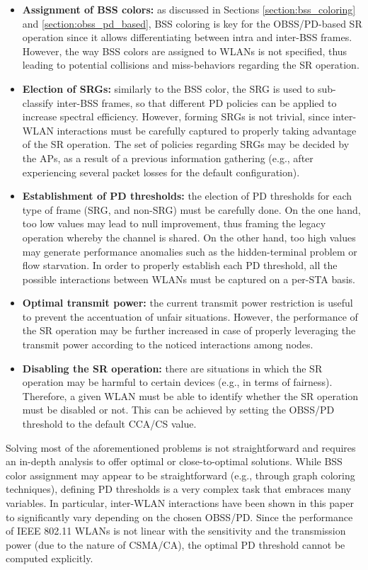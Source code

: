 \documentclass[comsoc]{IEEEtran}
\begin{document}
	\begin{itemize}
		\item \textbf{Assignment of BSS colors:} as discussed in Sections \ref{section:bss_coloring} and \ref{section:obss_pd_based}, BSS coloring is key for the OBSS/PD-based SR operation since it allows differentiating between intra and inter-BSS frames. However, the way BSS colors are assigned to WLANs is not specified, thus leading to potential collisions and miss-behaviors regarding the SR operation.
		\item \textbf{Election of SRGs:} similarly to the BSS color, the SRG is used to sub-classify inter-BSS frames, so that different PD policies can be applied to increase spectral efficiency. However, forming SRGs is not trivial, since inter-WLAN interactions must be carefully captured to properly taking advantage of the SR operation. The set of policies regarding SRGs may be decided by the APs, as a result of a previous information gathering (e.g., after experiencing several packet losses for the default configuration).
		\item \textbf{Establishment of PD thresholds:} the election of PD thresholds for each type of frame (SRG, and non-SRG) must be carefully done. On the one hand, too low values may lead to null improvement, thus framing the legacy operation whereby the channel is shared. On the other hand, too high values may generate performance anomalies such as the hidden-terminal problem or flow starvation. In order to properly establish each PD threshold, all the possible interactions between WLANs must be captured on a per-STA basis.
		\item \textbf{Optimal transmit power:} the current transmit power restriction is useful to prevent the accentuation of unfair situations. However, the performance of the SR operation may be further increased in case of properly leveraging the transmit power according to the noticed interactions among nodes.
		\item \textbf{Disabling the SR operation:} there are situations in which the SR operation may be harmful to certain devices (e.g., in terms of fairness). Therefore, a given WLAN must be able to identify whether the SR operation must be disabled or not. This can be achieved by setting the OBSS/PD threshold to the default CCA/CS value.
	\end{itemize}
	
	Solving most of the aforementioned problems is not straightforward and requires an in-depth analysis to offer optimal or close-to-optimal solutions. While BSS color assignment may appear to be straightforward (e.g., through graph coloring techniques), defining PD thresholds is a very complex task that embraces many variables. In particular, inter-WLAN interactions have been shown in this paper to significantly vary depending on the chosen OBSS/PD. Since the performance of IEEE 802.11 WLANs is not linear with the sensitivity and the transmission power (due to the nature of CSMA/CA), the optimal PD threshold cannot be computed explicitly. 
	
\end{document}
